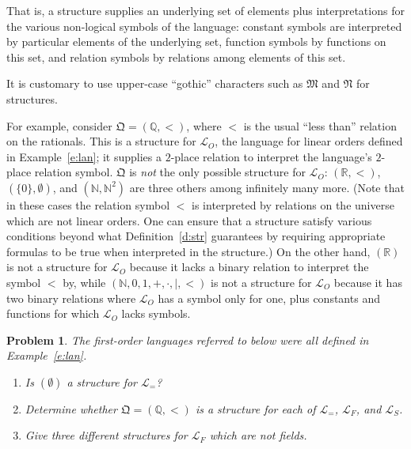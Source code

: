\documentclass[12pt]{amsbook}
\theoremstyle{plain}
\newtheorem{prob}[thm]{Problem}
\theoremstyle{definition}
\theoremstyle{remark}
\begin{document}
That is,  a structure supplies an underlying set of elements plus interpretations for the various non-logical symbols of the language:  constant symbols are interpreted by particular elements of the underlying set,  function symbols by functions on this set,  and relation symbols by relations among elements of this set.

It is customary to use upper-case ``gothic'' characters such as $\mathfrak{M}$ and $\mathfrak{N}$ for structures.  

For example,  consider $\mathfrak{Q} = (\mathbb{Q}, <)$,  where $<$ is the usual ``less than'' relation on the rationals.  This is a structure for $\mathcal{L}_O$,  the language for linear orders defined in Example~\ref{e:lan};  it supplies a $2$-place relation to interpret the language's $2$-place relation symbol.  $\mathfrak{Q}$ is {\em not\/} the only possible structure for $\mathcal{L}_O$:  $(\mathbb{R}, < )$,  $(\{0\}, \emptyset)$,  and $(\mathbb{N}, \mathbb{N}^2)$ are three others among infinitely many more.  (Note that in these cases the relation symbol $<$ is interpreted by relations on the universe which are not linear orders.  One can ensure that a structure satisfy various conditions beyond what Definition~\ref{d:str} guarantees by requiring appropriate formulas to be true when interpreted in the structure.)  On the other hand,  $(\mathbb{R})$ is not a structure for $\mathcal{L}_O$ because it lacks a binary relation to interpret the symbol $<$ by,  while $(\mathbb{N}, 0, 1, +, \cdot, |, <)$ is not a structure for $\mathcal{L}_O$ because it has two binary relations where $\mathcal{L}_O$ has a symbol only for one,  plus constants and functions for which $\mathcal{L}_O$ lacks symbols.   

\begin{prob} \label{p:six1}
The first-order languages referred to below were all defined in Example~\ref{e:lan}.
\begin{enumerate}
\item Is $(\emptyset)$ a structure for $\mathcal{L}_=$?
\item Determine whether $\mathfrak Q = (\mathbb{Q}, <)$ is a structure for each of $\mathcal{L}_=$,  $\mathcal{L}_F$,  and $\mathcal{L}_S$.
\item Give three different structures for $\mathcal{L}_F$ which are not fields.
\end{enumerate}
\end{prob}
\end{document}
